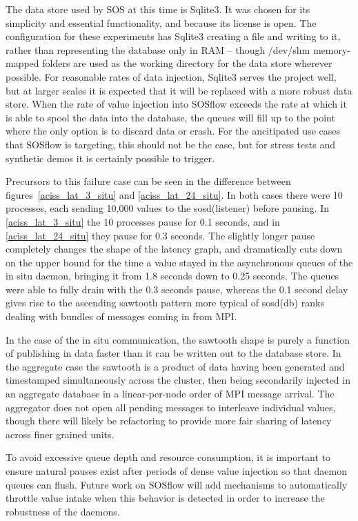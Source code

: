
The data store used by SOS at this time is Sqlite3.
%
It was chosen for its simplicity and essential functionality, and
because its license is open.
%
The configuration for these experiments has Sqlite3 creating a file
and writing to it, rather than representing the database only in RAM
-- though /dev/shm memory-mapped folders are used as the working
directory for the data store wherever possible.
%
For reasonable rates of data injection, Sqlite3 serves the project
well, but at larger scales it is expected that it will be replaced
with a more robust data store.
%
When the rate of value injection into SOSflow exceeds the rate at
which it is able to spool the data into the database, the queues will
fill up to the point where the only option is to discard data or
crash.
%
For the ancitipated use cases that SOSflow is targeting, this should
not be the case, but for stress tests and synthetic demos it is
certainly possible to trigger.

Precursors to this failure case can be seen in the difference between
figures~\ref{aciss_lat_3_situ} and \ref{aciss_lat_24_situ}.
%
In both cases there were 10 processes, each sending 10,000 values to
the sosd(listener) before pausing.
%
In \ref{aciss_lat_3_situ} the 10 processes pause for 0.1 seconds, and
in \ref{aciss_lat_24_situ} they pause for 0.3 seconds.
%
The slightly longer pause completely changes the shape of the latency
graph, and dramatically cuts down on the upper bound for the time a
value stayed in the asynchronous queues of the in situ daemon,
bringing it from 1.8 seconds down to 0.25 seconds.
%
The queues were able to fully drain with the 0.3 seconds pause,
whereas the 0.1 second delay gives rise to the ascending sawtooth
pattern more typical of sosd(db) ranks dealing with bundles of
messages coming in from MPI.

In the case of the in situ communication, the sawtooth shape is purely
a function of publishing in data faster than it can be written out to
the database store.
%
In the aggregate case the sawtooth is a product of data having been
generated and timestamped simultaneously across the cluster, then
being secondarily injected in an aggregate database in a
linear-per-node order of MPI message arrival.
%
The aggregator does not open all pending messages to interleave
individual values, though there will likely be refactoring to provide
more fair sharing of latency across finer grained units.

To avoid excessive queue depth and resource consumption, it is
important to ensure natural pauses exist after periods of dense value
injection so that daemon queues can flush.
%
Future work on SOSflow will add mechanisms to automatically throttle
value intake when this behavior is detected in order to increase the
robustness of the daemons.



